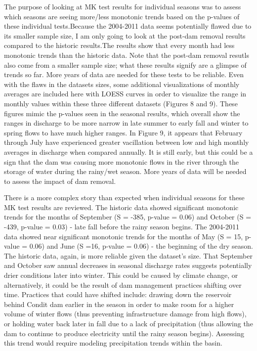 \documentclass[
  12pt,
]{article}
\begin{document}
The purpose of looking at MK test results for individual seasons was to
assess which seasons are seeing more/less monotonic trends based on the
p-values of these individual tests.Because the 2004-2011 data seems
potentially flawed due to its smaller sample size, I am only going to
look at the post-dam removal results compared to the historic
results.The results show that every month had less monotonic trends than
the historic data. Note that the post-dam removal resutls also come from
a smaller sample size; what these results signify are a glimpse of
trends so far. More years of data are needed for these tests to be
reliable. Even with the flaws in the datasets sizes, some additional
visualizations of monthly averages are included here with LOESS curves
in order to visualize the range in monthly values within these three
different datasets (Figures 8 and 9). These figures mimic the p-values
seen in the seasonal results, which overall show the ranges in discharge
to be more narrow in late summer to early fall and winter to spring
flows to have much higher ranges. In Figure 9, it appears that February
through July have experienced greater vacillation between low and high
monthly averages in discharge when compared annually. It is still early,
but this could be a sign that the dam was causing more monotonic flows
in the river through the storage of water during the rainy/wet season.
More years of data will be needed to assess the impact of dam removal.

There is a more complex story than expected when individual seasons for
these MK test results are reviewed. The historic data showed significant
monotonic trends for the months of September (S = -385, p-value = 0.06)
and October (S = -439, p-value = 0.03) - late fall before the rainy
season begins. The 2004-2011 data showed near significant monotonic
trends for the months of May (S = 15, p-value = 0.06) and June (S =16,
p-value = 0.06) - the beginning of the dry season. The historic data,
again, is more reliable given the dataset's size. That September and
October saw annual decreases in seasonal discharge rates suggests
potentially drier conditions later into winter. This could be caused by
climate change, or alternatively, it could be the result of dam
management practices shifting over time. Practices that could have
shifted include: drawing down the reservoir behind Condit dam earlier in
the season in order to make room for a higher volume of winter flows
(thus preventing infrastructure damage from high flows), or holding
water back later in fall due to a lack of precipitation (thus allowing
the dam to continue to produce electricity until the rainy season
begins). Assessing this trend would require modeling precipitation
trends within the basin.
\end{document}
